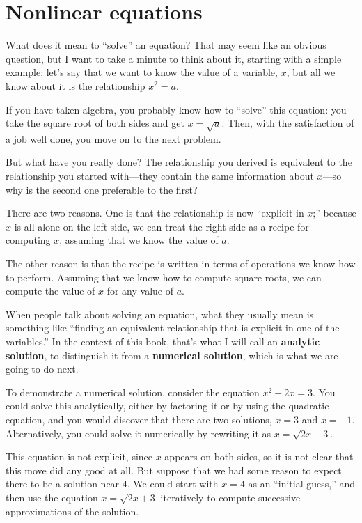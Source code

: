\documentclass{book}
\begin{document}
\section{Nonlinear equations}

What does it mean to ``solve'' an equation? That may seem like an
obvious question, but I want to take a minute to think about it,
starting with a simple example: let's say that we want to know the
value of a variable, $x$, but all we know about it is the relationship
$x^2 = a$.

If you have taken algebra, you probably know how to ``solve'' this
equation: you take the square root of both sides and get
$x = \sqrt{a}$. Then, with the satisfaction of a job well done,
you move on to the next problem.

But what have you really done? The relationship you derived is
equivalent to the relationship you started with---they contain the
same information about $x$---so why is the second one preferable
to the first?

There are two reasons. One is that the relationship is now ``explicit
in $x$;'' because $x$ is all alone on the left side, we can treat
the right side as a recipe for computing $x$, assuming that we
know the value of $a$.

The other reason is that the recipe is written in terms of operations
we know how to perform. Assuming that we know how to compute square
roots, we can compute the value of $x$ for any value of $a$.

When people talk about solving an equation, what they usually mean
is something like ``finding an equivalent relationship that is
explicit in one of the variables.'' In the context of this book,
that's what I will call an {\bf analytic solution}, to distinguish
it from a {\bf numerical solution}, which is what we are going to
do next.

To demonstrate a numerical solution, consider the equation $x^2 - 2x =
3$. You could solve this analytically, either by factoring it or by
using the quadratic equation, and you would discover that there are
two solutions, $x=3$ and $x=-1$. Alternatively, you could solve it
numerically by rewriting it as $x = \sqrt{2x+3}$.

This equation is not explicit, since $x$ appears on both sides, so
it is not clear that this move did any good at all. But suppose
that we had some reason to expect there to be a solution near 4.
We could start with $x=4$ as an ``initial guess,'' and then use
the equation $x = \sqrt{2x+3}$ iteratively to compute successive
approximations of the solution.
\end{document}
